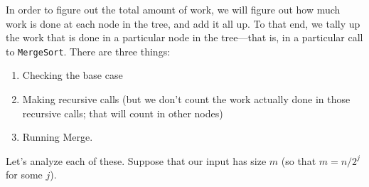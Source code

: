 \documentclass [12pt]{article}
\begin{document}
In order to figure out the total amount of work, we will figure out how much work is done at each node in the tree, and add it all up. To that end, we tally up the work that is done in a particular node in the tree—that is, in a particular call to \texttt{MergeSort}. There are three things:

\begin{enumerate}
    \item Checking the base case
    \item Making recursive calls (but we don't count the work actually done in those recursive calls; that will count in other nodes)
    \item Running Merge.
\end{enumerate}

Let's analyze each of these. Suppose that our input has size $m$ (so that $m = n/2^j$ for some $j$).
\end{document}
